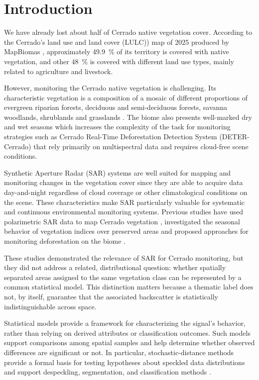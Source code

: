 \section{Introduction}

We have already lost about half of Cerrado native vegetation cover.
According to the Cerrado's land use and land cover (LULC)) map of 2025 produced by MapBiomas \cite{mapbiomas2026}, approximately \qty{49.9}{\percent} of its territory is covered with native vegetation, and other \qty{48}{\percent} is covered with different land use types, mainly related to agriculture and livestock.

However, monitoring the Cerrado native vegetation is challenging.
Its characteristic vegetation is a composition of a mosaic of different proportions of evergreen riparian forests, deciduous and semi-deciduous forests, savanna woodlands, shrublands and grasslands \cite{ribeirowalter2008}.
The biome also presents well-marked dry and wet seasons \cite{sano2021} which increases the complexity of the task for monitoring strategies such as Cerrado Real-Time Deforestation Detection System (DETER-Cerrado) that rely primarily on multispectral data and requires cloud-free scene conditions.

Synthetic Aperture Radar (SAR) systems are well suited for mapping and monitoring changes in the vegetation cover since they are able to acquire data day-and-night regardless of cloud coverage or other climatological conditions on the scene.
These characteristics make SAR particularly valuable for systematic and continuous environmental monitoring systems.
Previous studies have used polarimetric SAR data to map Cerrado vegetation \cite{sano2021}, investigated the seasonal behavior of vegetation indices over preserved areas \cite{bussinguer2024} and proposed approaches for monitoring deforestation on the biome \cite{bottani2026}.

These studies demonstrated the relevance of SAR for Cerrado monitoring, but they did not address a related, distributional question: whether spatially separated areas assigned to the same vegetation class can be represented by a common statistical model.
This distinction matters because a thematic label does not, by itself, guarantee that the associated backscatter is statistically indistinguishable across space.

Statistical models provide a framework for characterizing the signal’s behavior, rather than relying on derived attributes or classification outcomes.
Such models support comparisons among spatial samples and help determine whether observed differences are significant or not.
In particular, stochastic-distance methods provide a formal basis for testing hypotheses about speckled data distributions and support despeckling, segmentation, and classification methods \cite{nascimento2010}.

